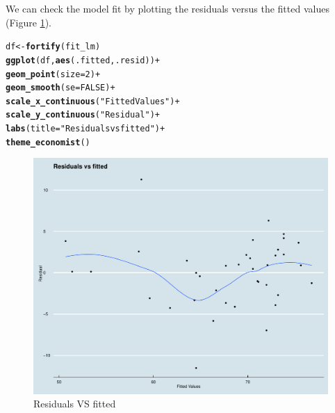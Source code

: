 \documentclass[12pt]{article}\usepackage[]{graphicx}\usepackage[]{color}
\makeatletter
\newcommand{\hlnum}[1]{\textcolor[rgb]{0.686,0.059,0.569}{#1}}%
\newcommand{\hlstr}[1]{\textcolor[rgb]{0.192,0.494,0.8}{#1}}%
\newcommand{\hlopt}[1]{\textcolor[rgb]{0,0,0}{#1}}%
\newcommand{\hlstd}[1]{\textcolor[rgb]{0.345,0.345,0.345}{#1}}%
\newcommand{\hlkwb}[1]{\textcolor[rgb]{0.69,0.353,0.396}{#1}}%
\newcommand{\hlkwc}[1]{\textcolor[rgb]{0.333,0.667,0.333}{#1}}%
\newcommand{\hlkwd}[1]{\textcolor[rgb]{0.737,0.353,0.396}{\textbf{#1}}}%
\newenvironment{kframe}{%
 \def\at@end@of@kframe{}%
 \ifinner\ifhmode%
  \def\at@end@of@kframe{\end{minipage}}%
  \begin{minipage}{\columnwidth}%
 \fi\fi%
 \def\FrameCommand##1{\hskip\@totalleftmargin \hskip-\fboxsep
 \colorbox{shadecolor}{##1}\hskip-\fboxsep
     \hskip-\linewidth \hskip-\@totalleftmargin \hskip\columnwidth}%
 \MakeFramed {\advance\hsize-\width
   \@totalleftmargin\z@ \linewidth\hsize
   \@setminipage}}%
 {\par\unskip\endMakeFramed%
 \at@end@of@kframe}
\newenvironment{knitrout}{}{} %
\makeatother
\begin{document}
We can check the model fit by plotting the residuals versus the fitted
values (Figure \ref{fig:res_vs_fit}).
\begin{knitrout}\scriptsize
{}\color{fgcolor}\begin{kframe}
\begin{alltt}
\hlstd{df} \hlkwb{<-} \hlkwd{fortify}\hlstd{(fit_lm)}
\hlkwd{ggplot}\hlstd{(df,} \hlkwd{aes}\hlstd{(.fitted, .resid))} \hlopt{+}
  \hlkwd{geom_point}\hlstd{(}\hlkwc{size} \hlstd{=} \hlnum{2}\hlstd{)}  \hlopt{+}
  \hlkwd{geom_smooth}\hlstd{(}\hlkwc{se}\hlstd{=}\hlnum{FALSE}\hlstd{)} \hlopt{+}
  \hlkwd{scale_x_continuous}\hlstd{(}\hlstr{"Fitted Values"}\hlstd{)} \hlopt{+}
  \hlkwd{scale_y_continuous}\hlstd{(}\hlstr{"Residual"}\hlstd{)} \hlopt{+}
  \hlkwd{labs}\hlstd{(}\hlkwc{title} \hlstd{=} \hlstr{"Residuals vs fitted"}\hlstd{)} \hlopt{+}
  \hlkwd{theme_economist}\hlstd{()}
\end{alltt}


{\ttfamily\noindent\itshape{}}\end{kframe}\begin{figure}[h]

{\centering \includegraphics[width=.7\textwidth]{graphics/res_vs_fit-1} 

}

\caption[Residuals VS fitted]{Residuals VS fitted}\label{fig:res_vs_fit}
\end{figure}


\end{knitrout}
\end{document}
